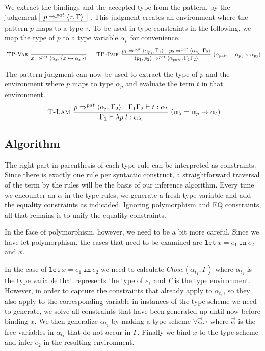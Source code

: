 \documentclass[a4paper]{article}
\newcommand{\s}[1]{\mathtt{#1}}
\newcommand{\sletin}[2]{\s{let\ } #1 \s{\ in\ } #2}
\newcommand{\patbind}{\Rightarrow^{pat}}
\newcommand{\angled}[1]{\langle #1\rangle}
\renewcommand{\rule}[3][]{\ \mbox{\textsc{#1 }}\dfrac{#2}{#3}\ }
\newcommand{\smbox}[1]{
  $\begin{array}{|c|}
    \hline
    #1 \\
    \hline
  \end{array}$
}
\begin{document}
We extract the bindings and the accepted type from the
pattern, by the judgement \smbox{p \patbind \angled{\tau,\Gamma}}. This judgment creates an environment where the pattern $p$ maps to a type $\tau$. To be used in type constraints in the following, we map the type of $p$ to a type variable $\alpha_p$ for convenience.
\[
\rule[TP-Var]{}{x \patbind \angled{\alpha_x,\{x \mapsto \alpha_x\}}}\quad
\rule[TP-Pair]{p_1 \patbind \angled{\alpha_{p_1},\Gamma_1}\quad p_2 \patbind \angled{\alpha_{p_2},\Gamma_2}}
{(p_1, p_2) \patbind \angled{\alpha_{pair},\Gamma_1\Gamma_2}}(\alpha_{pair} = \alpha_{p_1}\times\alpha_{p_2})
\]

The pattern judgment can now be used to extract the type of $p$ and the environment where $p$ maps to type $\alpha_p$ and evaluate the term $t$ in that environment.
\[
\rule[T-Lam]{p \patbind \angled{\alpha_p,\Gamma_2} \quad\Gamma_1\Gamma_2 \vdash t : \alpha_t}{\Gamma_1 \vdash \lambda p.t : \alpha_{\lambda}} (\alpha_\lambda = \alpha_p \to \alpha_t)
\]

\subsection{Algorithm}
\label{typeInference}

The right part in parenthesis of each type rule can be interpreted 
as constraints. Since there is exactly one rule per syntactic 
construct, a straightforward traversal of the term by the rules 
will be the basis of our inference algorithm. Every time we 
encounter an $\alpha$ in the type rules, we generate a fresh type 
variable and add the equality constraints as indicaded. Ignoring 
polymorphism and EQ constraints, all that remains is to unify 
the equality constraints. 

In the face of polymorphism, however, we need to be a bit more 
careful. Since we have let-polymorphism, the cases that need to be
examined are $\sletin{x = e_1}{e_2}$ and $x$. 

In the case of $\sletin{x = e_1}{e_2}$ we need to calculate 
$Close(\alpha_{t_1},\Gamma)$ where $\alpha_{t_1}$ is the type 
variable that represents the type of $e_1$ and $\Gamma$ is the 
type environment. However, in order to capture the constraints
that already apply to $\alpha_{t_1}$, so they also apply to 
the corresponding variable in instances of the type scheme we 
need to generate, we solve all constraints that have been 
generated up until now before binding $x$. We then generalize
$\alpha_{t_1}$ by making a type scheme $\forall \vec{\alpha}.\tau$
where $\vec{\alpha}$ is the free variables in $\alpha_{t_1}$ that
do not occur in $\Gamma$. Finally we bind $x$ to the type scheme 
and infer $e_2$ in the resulting environment.
\end{document}
